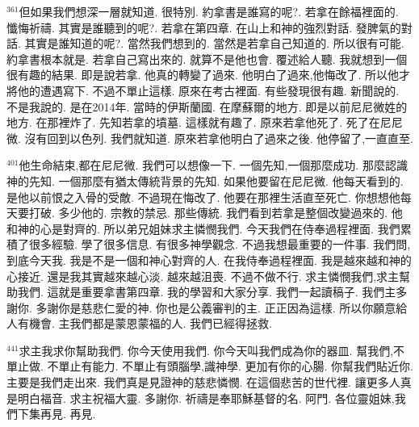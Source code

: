 \documentclass{book}
\begin{document}
$^{361}$但如果我們想深一層就知道.
很特別.
約拿書是誰寫的呢?.
若拿在餘福裡面的.
懺悔祈禱.
其實是誰聽到的呢?.
若拿在第四章.
在山上和神的強烈對話.
發脾氣的對話.
其實是誰知道的呢?.
當然我們想到的.
當然是若拿自己知道的.
所以很有可能.
約拿書根本就是.
若拿自己寫出來的.
就算不是他也會.
覆述給人聽.
我就想到一個很有趣的結果.
即是說若拿.
他真的轉變了過來.
他明白了過來,他悔改了.
所以他才將他的遭遇寫下.
不過不單止這樣.
原來在考古裡面.
有些發現很有趣.
新聞說的.
不是我說的.
是在2014年.
當時的伊斯蘭國.
在摩蘇爾的地方.
即是以前尼尼微姓的地方.
在那裡炸了.
先知若拿的墳墓.
這樣就有趣了.
原來若拿他死了.
死了在尼尼微.
沒有回到以色列.
我們就知道.
原來若拿他明白了過來之後.
他停留了,一直直至.

$^{401}$他生命結束,都在尼尼微.
我們可以想像一下.
一個先知,一個那麼成功.
那麼認識神的先知.
一個那麼有猶太傳統背景的先知.
如果他要留在尼尼微.
他每天看到的.
是他以前恨之入骨的受敵.
不過現在悔改了.
他要在那裡生活直至死亡.
你想想他每天要打破.
多少他的.
宗教的禁忌.
那些傳統.
我們看到若拿是整個改變過來的.
他和神的心是對齊的.
所以弟兄姐妹求主憐憫我們.
今天我們在侍奉過程裡面.
我們累積了很多經驗.
學了很多信息.
有很多神學觀念.
不過我想最重要的一件事.
我們問,到底今天我.
我是不是一個和神心對齊的人.
在我侍奉過程裡面.
我是越來越和神的心接近.
還是我其實越來越心淡.
越來越沮喪.
不過不做不行.
求主憐憫我們,求主幫助我們.
這就是重要拿書第四章.
我的學習和大家分享.
我們一起讀稿子.
我們主多謝你.
多謝你是慈悲仁愛的神.
你也是公義審判的主.
正正因為這樣.
所以你願意給人有機會.
主我們都是蒙恩蒙福的人.
我們已經得拯救.

$^{441}$求主我求你幫助我們.
你今天使用我們.
你今天叫我們成為你的器皿.
幫我們,不單止做.
不單止有能力.
不單止有頭腦學,識神學.
更加有你的心腸.
你幫我們貼近你.
主要是我們走出來.
我們真是見證神的慈悲憐憫.
在這個悲苦的世代裡.
讓更多人真是明白福音.
求主祝福大靈.
多謝你.
祈禱是奉耶穌基督的名.
阿門.
各位靈姐妹,我們下集再見.
再見.
\newpage
\end{document}
